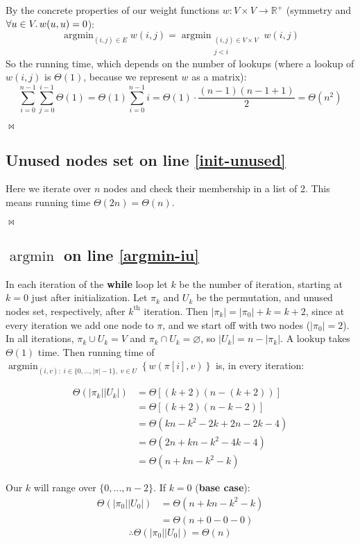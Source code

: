 \documentclass{article}
\DeclareMathOperator*{\argmin}{argmin}
\newcommand{\qed}{\begin{flushright}$\bowtie$\end{flushright}}
\newcommand{\bb}[1]{\textbf{#1}}
\begin{document}
By the concrete properties of our weight functions $w:V\times V\to\mathbb{R}^{+}$
(symmetry and $\forall u\in V\ldotp w(u,u)=0$):
\[ \argmin_{(i,j)\in E} w(i,j) = \argmin_{\substack{(i,j)\in V\times V\\j<i}} w(i,j) \]
So the running time, which depends on the number of lookups (where a lookup of $w(i,j)$
is $\Theta(1)$, because we represent $w$ as a matrix):
\[ \sum_{i=0}^{n-1} \sum_{j=0}^{i-1} \Theta(1) = \Theta(1) \sum_{i=0}^{n-1} i
  = \Theta(1) \cdot \frac{(n-1)(n-1+1)}{2} = \Theta(n^2) \]
\qed

\subsection{Unused nodes set on line \ref*{init-unused}}

Here we iterate over $n$ nodes and check their membership in a list of 2. This means
running time $\Theta(2n) = \Theta(n)$. \qed

\subsection{$\argmin$ on line \ref*{argmin-iu}}

In each iteration of the \bb{while} loop let $k$ be the number of iteration,
starting at $k=0$ just after initialization. Let $\pi_k$ and $U_k$ be the permutation,
and unused nodes set, respectively, after $k^{\mathrm{th}}$ iteration.
Then $|\pi_k| = |\pi_0|+k = k+2$, since at every iteration we
add one node to $\pi$, and we start off with two nodes ($|\pi_0|=2$). In all iterations,
$\pi_k\cup U_k=V$ and $\pi_k\cap U_k=\varnothing$, so $|U_k|=n-|\pi_k|$. A lookup takes
$\Theta(1)$ time. Then running time of $\argmin_{(i,v):\;i\in\{0,...,|\pi|-1\},\;v\in U}
\left\{w\left(\pi[i], v\right)\right\}$ is, in every iteration:

\begin{align*}
  \Theta(|\pi_k||U_k|) & = \Theta\left[ (k+2)(n-(k+2)) \right] \\
                       & = \Theta\left[ (k+2)(n-k-2) \right] \\
                       & = \Theta(kn - k^2 - 2k + 2n - 2k - 4) \\
                       & = \Theta(2n + kn - k^2 - 4k - 4) \\
                       & = \Theta(n + kn - k^2 - k)
\end{align*}

Our $k$ will range over $\{0,...,n-2\}$. If $k=0$ (\bb{base case}):
\begin{align*}
  \Theta(|\pi_0||U_0|) & = \Theta(n + kn - k^2 - k) \\
                       & = \Theta(n + 0 - 0 - 0)
\end{align*}
\begin{equation}
  \label{base-case}
  \therefore \Theta(|\pi_0||U_0|) = \Theta(n)
\end{equation}
\end{document}
